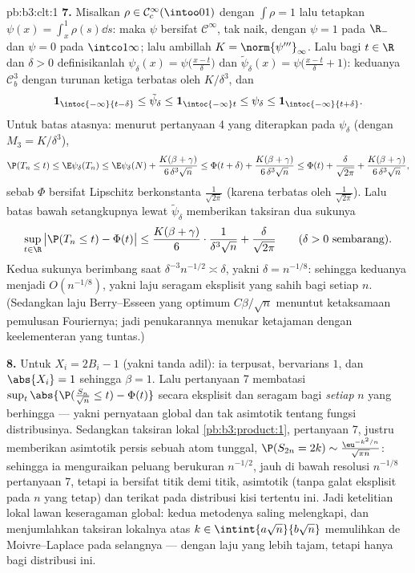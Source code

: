 \begin{solution}{pb:b3:clt:1}
\textbf{7.} Misalkan $\rho \in \mathcal C^\infty_c(\intoo01)$
dengan $\int\rho = 1$ lalu tetapkan $\psi(x) = \int_x^1\rho(s)\dd
s$: maka $\psi$ bersifat $\mathcal C^\infty$, tak naik, dengan $\psi = 1$
pada $\R_-$ dan $\psi = 0$ pada $\intco1\infty$; lalu ambillah $K =
\norm{\psi'''}_\infty$. Lalu bagi $t \in \R$ dan $\delta > 0$
definisikanlah $\psi_\delta(x) = \psi\bigl(\frac{x - t}\delta\bigr)$
dan $\tilde\psi_\delta(x) = \psi\bigl(\frac{x - t}\delta +
1\bigr)$: keduanya $\mathcal C^3_b$ dengan turunan ketiga
terbatas oleh $K/\delta^3$, dan
\[
\mathbf 1_{\intoc{-\infty}{t-\delta}} \leq
\tilde\psi_\delta \leq \mathbf 1_{\intoc{-\infty}t} \leq
\psi_\delta \leq \mathbf 1_{\intoc{-\infty}{t+\delta}} .
\]
Untuk batas atasnya: menurut pertanyaan 4 yang diterapkan pada $\psi_\delta$ (dengan
$M_3 = K/\delta^3$),
\[
\P(T_n \leq t) \leq \E\psi_\delta(T_n) \leq
\E\psi_\delta(N) + \frac{K(\beta +
\gamma)}{6\,\delta^3\sqrt n}
\leq \Phi(t + \delta) + \frac{K(\beta +
\gamma)}{6\,\delta^3\sqrt n}
\leq \Phi(t) + \frac{\delta}{\sqrt{2\pi}} +
\frac{K(\beta + \gamma)}{6\,\delta^3\sqrt n},
\]
sebab $\Phi$ bersifat Lipschitz berkonstanta
$\frac1{\sqrt{2\pi}}$ (karena  terbatas oleh
$\frac1{\sqrt{2\pi}}$). Lalu batas bawah setangkupnya lewat
$\tilde\psi_\delta$ memberikan taksiran dua sukunya
\[
\sup_{t\in\R}\,\bigl|\P(T_n \leq t) - \Phi(t)\bigr| \leq
\frac{K(\beta + \gamma)}{6}\cdot\frac{1}{\delta^3\sqrt n} +
\frac{\delta}{\sqrt{2\pi}}
\qquad(\delta > 0\ \text{sembarang}).
\]
Kedua sukunya berimbang saat $\delta^{-3}n^{-1/2} \asymp
\delta$, yakni $\delta = n^{-1/8}$: sehingga keduanya menjadi
$O(n^{-1/8})$, yakni laju seragam eksplisit yang sahih bagi setiap
$n$. (Sedangkan laju Berry--Esseen yang optimum $C\beta/\sqrt n$
menuntut ketaksamaan pemulusan Fouriernya; jadi penukarannya menukar
ketajaman dengan keelementeran yang tuntas.)

\textbf{8.} Untuk $X_i = 2B_i - 1$ (yakni tanda adil): ia terpusat,
bervarians $1$, dan $\abs{X_i} = 1$ sehingga $\beta = 1$. Lalu pertanyaan 7
membatasi $\sup_t\abs{\P(\frac{S_n}{\sqrt n} \leq t) -
\Phi(t)}$ secara eksplisit dan seragam bagi \emph{setiap} $n$ yang
berhingga --- yakni pernyataan global dan tak asimtotik tentang
fungsi distribusinya. Sedangkan taksiran lokal
\cref{pb:b3:product:1}, pertanyaan 7, justru memberikan asimtotik
persis sebuah atom tunggal, $\P(S_{2n} = 2k) \sim
\frac{\eu^{-k^2/n}}{\sqrt{\pi n}}$: sehingga ia menguraikan
peluang berukuran $n^{-1/2}$, jauh di bawah resolusi $n^{-1/8}$
pertanyaan 7, tetapi ia bersifat titik demi titik, asimtotik
(tanpa galat eksplisit pada $n$ yang tetap) dan terikat pada
distribusi kisi tertentu ini. Jadi ketelitian lokal lawan
keseragaman global: kedua metodenya saling melengkapi, dan menjumlahkan
taksiran lokalnya atas $k \in \intint{a\sqrt n}{b\sqrt n}$
memulihkan de Moivre--Laplace pada selangnya --- dengan laju
yang lebih tajam, tetapi hanya bagi distribusi ini.


\end{solution}
